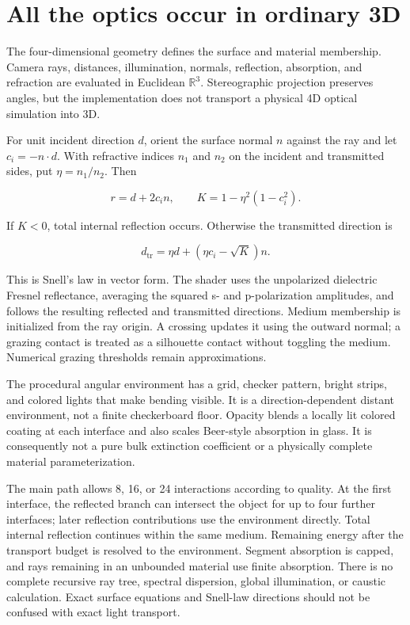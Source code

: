 \documentclass[11pt,a4paper]{article}
\begin{document}
\section{All the optics occur in ordinary
3D}\label{all-the-optics-occur-in-ordinary-3d}

The four-dimensional geometry defines the surface and material
membership. Camera rays, distances, illumination, normals, reflection,
absorption, and refraction are evaluated in Euclidean \(\mathbb R^3\).
Stereographic projection preserves angles, but the implementation does
not transport a physical 4D optical simulation into 3D.

For unit incident direction \(d\), orient the surface normal \(n\)
against the ray and let \(c_i=-n\cdot d\). With refractive indices
\(n_1\) and \(n_2\) on the incident and transmitted sides, put
\(\eta=n_1/n_2\). Then

\[
r=d+2c_i n,\qquad K=1-\eta^2(1-c_i^2).
\]

If \(K<0\), total internal reflection occurs. Otherwise the transmitted
direction is

\[
d_{\mathrm{tr}}=\eta d+(\eta c_i-\sqrt K)n.
\]

This is Snell's law in vector form. The shader uses the unpolarized
dielectric Fresnel reflectance, averaging the squared s- and
p-polarization amplitudes, and follows the resulting reflected and
transmitted directions. Medium membership is initialized from the ray
origin. A crossing updates it using the outward normal; a grazing
contact is treated as a silhouette contact without toggling the medium.
Numerical grazing thresholds remain approximations.

The procedural angular environment has a grid, checker pattern, bright
strips, and colored lights that make bending visible. It is a
direction-dependent distant environment, not a finite checkerboard
floor. Opacity blends a locally lit colored coating at each interface
and also scales Beer-style absorption in glass. It is consequently not a
pure bulk extinction coefficient or a physically complete material
parameterization.

The main path allows 8, 16, or 24 interactions according to quality. At
the first interface, the reflected branch can intersect the object for
up to four further interfaces; later reflection contributions use the
environment directly. Total internal reflection continues within the
same medium. Remaining energy after the transport budget is resolved to
the environment. Segment absorption is capped, and rays remaining in an
unbounded material use finite absorption. There is no complete recursive
ray tree, spectral dispersion, global illumination, or caustic
calculation. Exact surface equations and Snell-law directions should not
be confused with exact light transport.
\end{document}
